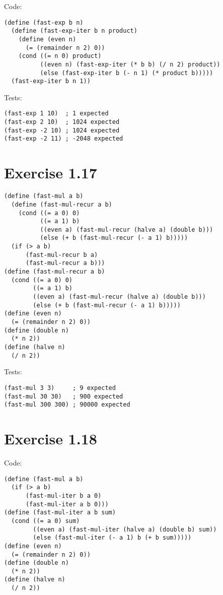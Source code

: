 \documentclass[../main.tex]{subfiles}
\begin{document}
Code:

\begin{lstlisting}
(define (fast-exp b n)
  (define (fast-exp-iter b n product)
    (define (even n)
      (= (remainder n 2) 0))
    (cond ((= n 0) product)
          ((even n) (fast-exp-iter (* b b) (/ n 2) product))
          (else (fast-exp-iter b (- n 1) (* product b)))))
  (fast-exp-iter b n 1))
\end{lstlisting}

Tests:

\begin{lstlisting}
(fast-exp 1 10)  ; 1 expected
(fast-exp 2 10)  ; 1024 expected
(fast-exp -2 10) ; 1024 expected
(fast-exp -2 11) ; -2048 expected
\end{lstlisting}

\section{Exercise 1.17}

\begin{lstlisting}
(define (fast-mul a b)
  (define (fast-mul-recur a b)
    (cond ((= a 0) 0)
          ((= a 1) b)
          ((even a) (fast-mul-recur (halve a) (double b)))
          (else (+ b (fast-mul-recur (- a 1) b)))))
  (if (> a b)
      (fast-mul-recur b a)
      (fast-mul-recur a b)))
(define (fast-mul-recur a b)
  (cond ((= a 0) 0)
        ((= a 1) b)
        ((even a) (fast-mul-recur (halve a) (double b)))
        (else (+ b (fast-mul-recur (- a 1) b)))))
(define (even n)
  (= (remainder n 2) 0))
(define (double n)
  (* n 2))
(define (halve n)
  (/ n 2))
\end{lstlisting}

Tests:

\begin{lstlisting}
(fast-mul 3 3)     ; 9 expected
(fast-mul 30 30)   ; 900 expected
(fast-mul 300 300) ; 90000 expected
\end{lstlisting}

\section{Exercise 1.18}

Code:

\begin{lstlisting}
(define (fast-mul a b)
  (if (> a b)
      (fast-mul-iter b a 0)
      (fast-mul-iter a b 0)))
(define (fast-mul-iter a b sum)
  (cond ((= a 0) sum)
        ((even a) (fast-mul-iter (halve a) (double b) sum))
        (else (fast-mul-iter (- a 1) b (+ b sum)))))
(define (even n)
  (= (remainder n 2) 0))
(define (double n)
  (* n 2))
(define (halve n)
  (/ n 2))
\end{lstlisting}
\end{document}
